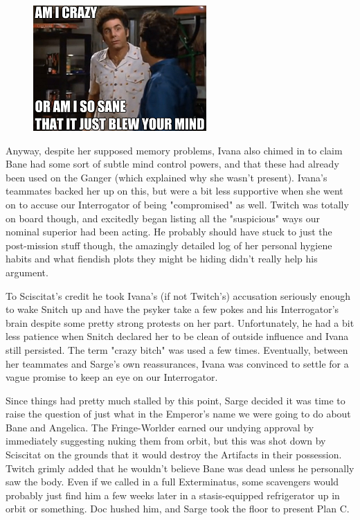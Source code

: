 \begin{figure}
	\begin{center}
		\includegraphics[width=\figwidth]{pics/19/12.png}
	\end{center}
\end{figure}
Anyway, despite her supposed memory problems, Ivana also chimed in to claim Bane had some sort of subtle mind control powers, and that these had already been used on the Ganger (which explained why she wasn't present). 
Ivana's teammates backed her up on this, but were a bit less supportive when she went on to accuse our Interrogator of being "compromised" as well. 
Twitch was totally on board though, and excitedly began listing all the "suspicious" ways our nominal superior had been acting. 
He probably should have stuck to just the post-mission stuff though, the amazingly detailed log of her personal hygiene habits and what fiendish plots they might be hiding didn't really help his argument. 


To Sciscitat's credit he took Ivana's (if not Twitch's) accusation seriously enough to wake Snitch up and have the psyker take a few pokes and his Interrogator's brain despite some pretty strong protests on her part. 
Unfortunately, he had a bit less patience when Snitch declared her to be clean of outside influence and Ivana still persisted. 
The term "crazy bitch" was used a few times. 
Eventually, between her teammates and Sarge's own reassurances, Ivana was convinced to settle for a vague promise to keep an eye on our Interrogator.

Since things had pretty much stalled by this point, Sarge decided it was time to raise the question of just what in the Emperor's name we were going to do about Bane and Angelica. 
The Fringe-Worlder earned our undying approval by immediately suggesting nuking them from orbit, but this was shot down by Sciscitat on the grounds that it would destroy the Artifacts in their possession. 
Twitch grimly added that he wouldn't believe Bane was dead unless he personally saw the body. 
Even if we called in a full Exterminatus, some scavengers would probably just find him a few weeks later in a stasis-equipped refrigerator up in orbit or something. 
Doc hushed him, and Sarge took the floor to present Plan C.

